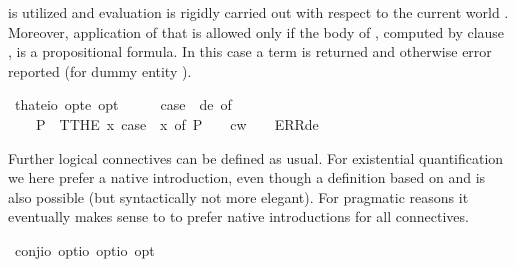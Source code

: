\begin{isabellebody}
\begin{isamarkuptext}
 is utilized and evaluation is rigidly carried out with respect to the current world .
 Moreover, application of that is allowed only if the body of \isa{{\isasymPhi}}, computed by clause 
 , is a propositional formula. In this case a term is returned and otherwise error 
 reported (for dummy entity ).%
\end{isamarkuptext}%
\isamarkuptrue%
\isamarkupfalse%
\ that{\isacharcolon}{\isacharcolon}{\isachardoublequoteopen}{\isacharparenleft}e{\isasymRightarrow}io\ opt{\isacharparenright}{\isasymRightarrow}e\ opt{\isachardoublequoteclose}{\isacharparenleft}{\isachardoublequoteopen}{\isasymiota}{\isachardoublequoteclose}{\isacharparenright}\ \ \ {\isachardoublequoteopen}{\isasymiota}\ {\isasymPhi}\ {\isasymequiv}\ case\ {\isacharparenleft}{\isasymPhi}\ de{\isacharparenright}\ of\isanewline
\ \ \ \ P{\isacharparenleft}{\isasymphi}{\isacharparenright}\ {\isasymRightarrow}\ T{\isacharparenleft}THE\ x{\isachardot}\ case\ {\isacharparenleft}{\isasymPhi}\ x{\isacharparenright}\ of\ P\ {\isasympsi}\ {\isasymRightarrow}\ {\isasympsi}\ cw{\isacharparenright}\ {\isacharbar}\ {\isacharunderscore}\ {\isasymRightarrow}\ ERR{\isacharparenleft}de{\isacharparenright}{\isachardoublequoteclose}%
\isamarkuptrue%
%
\begin{isamarkuptext}%
Further logical connectives can be defined as usual. For existential quantification we here
 prefer a native introduction, even though a definition based on \isa{\isactrlbold {\isasymnot}} and \isa{\isactrlbold {\isasymforall}} is also
 possible (but syntactically not more elegant). For pragmatic reasons it eventually makes sense to 
 to prefer native introductions for all connectives.%
\end{isamarkuptext}%
\isamarkuptrue%
\isamarkupfalse%
\ conj{\isacharcolon}{\isacharcolon}{\isachardoublequoteopen}io\ opt{\isasymRightarrow}io\ opt{\isasymRightarrow}io\ opt{\isachardoublequoteclose}{\isacharparenleft}\ {\isachardoublequoteopen}\isactrlbold {\isasymand}{\isachardoublequoteclose}\ {}{}{\isacharparenright}\ \ {\isachardoublequoteopen}{\isasymphi}\isactrlbold {\isasymand}{\isasympsi}\ {\isasymequiv}\ \isactrlbold {\isasymnot}{\isacharparenleft}{\isasymphi}\isactrlbold {\isasymrightarrow}\isactrlbold {\isasymnot}{\isasympsi}{\isacharparenright}{\isachardoublequoteclose}\isanewline
{}\isamarkupfalse%

\end{isabellebody}
